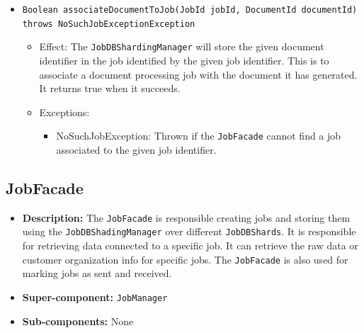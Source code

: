 \documentclass[a4paper,10pt]{article}
\begin{document}
\begin{itemize}
\begin{itemize}
    	\item \texttt{Boolean associateDocumentToJob(JobId jobId, DocumentId documentId) throws NoSuchJobExceptionException}
    	\begin{itemize}
    		\item Effect: The \texttt{JobDBShardingManager} will store the given document identifier in the job identified by the given job identifier. This is to associate a document processing job with the document it has generated. It returns true when it succeeds.
    		\item Exceptions:
    		\begin{itemize}
    			\item NoSuchJobException: Thrown if the \texttt{JobFacade} cannot find a job associated to the given job identifier.
    		\end{itemize}
    	\end{itemize} 	    	
    	
    \end{itemize}
\end{itemize}


\subsection{JobFacade}
\begin{itemize}
    \item \textbf{Description:} The \texttt{JobFacade} is responsible creating jobs and storing them using the \texttt{JobDBShadingManager} over different \texttt{JobDBShards}. It is responsible for retrieving data connected to a specific job. It can retrieve the raw data or customer organization info for specific jobs. The \texttt{JobFacade} is also used for marking jobs as sent and received.
    \item \textbf{Super-component:} \texttt{JobManager}
    \item \textbf{Sub-components:} None
\end{itemize}
\end{document}
